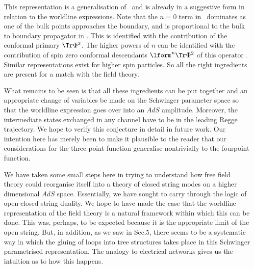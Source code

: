 This representation is a generalisation of \htk\  and is already in a suggestive form 
in relation to the worldline expressions.
Note that the $n=0$ term in \finbtob\ dominates as one of the 
bulk points approaches the boundary, and is proportional to the bulk to boundary propagator
in \htk . This is identified with the contribution of the conformal primary $\Tr\Phi^2$.  
The higher powers of $n$ can be identified with the 
contribution of spin zero conformal descendants $\lform^n\Tr\Phi^2$
of this operator \liu \dmmr{}. Similar representations 
exist for higher spin particles. So all the right ingredients are present for a match with the 
field theory.



What remains to be seen is that all these ingredients can be put 
together and an appropriate change of variables be made on the Schwinger parameter space 
so that the worldline expression 
goes over into an $AdS$ amplitude. Moreover, the intermediate states exchanged in any channel
have to be in
the leading Regge trajectory. We hope to verify this conjecture in detail in future
work. Our intention here has merely been to make it plausible 
to the reader that our considerations for the three point function generalise nontrivially 
to the fourpoint function.



We have taken some small steps here in trying to understand how free field theory 
could reorganise itself into a theory of closed string modes on a higher dimensional $AdS$ space.
Essentially, we have sought to carry through the logic of open-closed string duality.
We hope to have made the case that the worldline representation of the field theory 
is a natural framework within which this can be done. This was, perhaps, 
to be expected because it is the
appropriate limit of the open string. But, in addition, as we saw in Sec.5, 
there seems to be a systematic way in which 
the gluing of loops into tree structures takes place in this Schwinger parametrised 
representation. The analogy to electrical networks gives us the intuition as to how this happens. 


